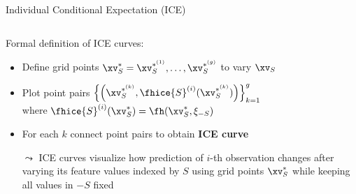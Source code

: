 \documentclass[10pt,compress,t,notes=noshow, xcolor=table]{beamer}
\begin{document}
\begin{frame}[c]{Individual Conditional Expectation (ICE) }
\begin{columns}[T, totalwidth=\textwidth]
\begin{column}{0.84\textwidth}
\medskip

Formal definition of ICE curves: 
\begin{itemize}
    \item Define grid points $\xv_S^* = \xv_S^{*^{(1)}}, \dots, \xv_S^{*^{(g)}}$ to vary $\xv_S$
    \item Plot point pairs $ \Bigl\{\left(\xv_S^{*^{(k)}}, \fhice{S}^{(i)}(\xv_S^{*^{(k)}}) \right) \Bigr\}_{k=1}^g$
    \\where $\fhice{S}^{(i)}(\xv_S^*) = \fh(\xv_S^*, \xi_{-S})$
    \item For each $k$ connect point pairs to obtain \textbf{ICE curve}
\end{itemize}

\medskip

\begin{itemize}
    \item[$\leadsto$] ICE curves visualize how prediction of $i$-th observation changes after varying its feature values indexed by $S$ using grid points $\xv_S^*$ while keeping all values in $-S$ fixed

\end{itemize}



\end{column}
\end{columns}




\end{frame}
\end{document}
